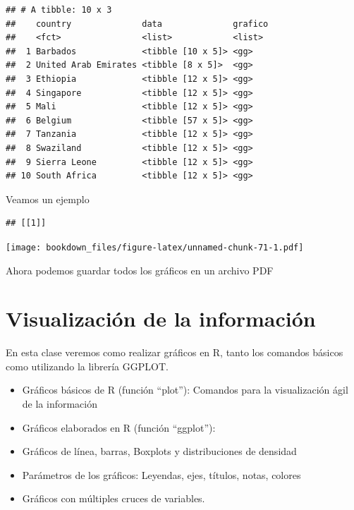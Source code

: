 \documentclass[]{book}
\newenvironment{Shaded}{\begin{snugshade}}{\end{snugshade}}
\newcommand{\DecValTok}[1]{\textcolor[rgb]{0.00,0.00,0.81}{#1}}
\newcommand{\KeywordTok}[1]{\textcolor[rgb]{0.13,0.29,0.53}{\textbf{#1}}}
\newcommand{\NormalTok}[1]{#1}
\newcommand{\OperatorTok}[1]{\textcolor[rgb]{0.81,0.36,0.00}{\textbf{#1}}}
\newcommand{\StringTok}[1]{\textcolor[rgb]{0.31,0.60,0.02}{#1}}
\providecommand{\tightlist}{%
  \setlength{\itemsep}{0pt}\setlength{\parskip}{0pt}}
\begin{document}
\begin{verbatim}
## # A tibble: 10 x 3
##    country              data              grafico
##    <fct>                <list>            <list> 
##  1 Barbados             <tibble [10 x 5]> <gg>   
##  2 United Arab Emirates <tibble [8 x 5]>  <gg>   
##  3 Ethiopia             <tibble [12 x 5]> <gg>   
##  4 Singapore            <tibble [12 x 5]> <gg>   
##  5 Mali                 <tibble [12 x 5]> <gg>   
##  6 Belgium              <tibble [57 x 5]> <gg>   
##  7 Tanzania             <tibble [12 x 5]> <gg>   
##  8 Swaziland            <tibble [12 x 5]> <gg>   
##  9 Sierra Leone         <tibble [12 x 5]> <gg>   
## 10 South Africa         <tibble [12 x 5]> <gg>
\end{verbatim}

Veamos un ejemplo

\begin{Shaded}
\end{Shaded}

\begin{verbatim}
## [[1]]
\end{verbatim}

\texttt{[image: bookdown\_files/figure-latex/unnamed-chunk-71-1.pdf]}

Ahora podemos guardar todos los gráficos en un archivo PDF

\begin{Shaded}
\end{Shaded}

\hypertarget{visualizacion-de-la-informacion}{%
\chapter{Visualización de la información}\label{visualizacion-de-la-informacion}}

En esta clase veremos como realizar gráficos en R, tanto los comandos básicos como utilizando la librería GGPLOT.

\begin{itemize}
\tightlist
\item
  Gráficos básicos de R (función ``plot''): Comandos para la visualización ágil de la información
\item
  Gráficos elaborados en R (función ``ggplot''):
\item
  Gráficos de línea, barras, Boxplots y distribuciones de densidad
\item
  Parámetros de los gráficos: Leyendas, ejes, títulos, notas, colores
\item
  Gráficos con múltiples cruces de variables.
\end{itemize}
\end{document}
